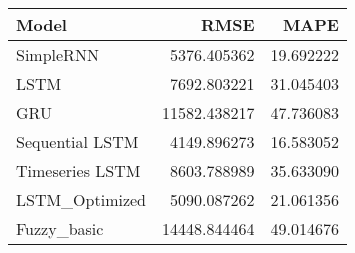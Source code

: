\begin{tabular}{lrr}
\toprule
Model & RMSE & MAPE \\
\midrule
SimpleRNN & 5376.405362 & 19.692222 \\
LSTM & 7692.803221 & 31.045403 \\
GRU & 11582.438217 & 47.736083 \\
Sequential LSTM & 4149.896273 & 16.583052 \\
Timeseries LSTM & 8603.788989 & 35.633090 \\
LSTM_Optimized & 5090.087262 & 21.061356 \\
Fuzzy_basic & 14448.844464 & 49.014676 \\
\bottomrule
\end{tabular}
